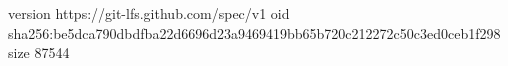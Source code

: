 version https://git-lfs.github.com/spec/v1
oid sha256:be5dca790dbdfba22d6696d23a9469419bb65b720c212272c50c3ed0ceb1f298
size 87544
